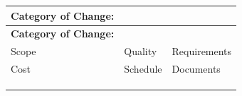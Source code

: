 \documentclass[10pt,letterpaper]{article}
\renewcommand\arraystretch{1.25}
\begin{document}
\begin{center}
\begingroup
\setlength\tabcolsep{2.0pt}
\footnotesize
\renewcommand\arraystretch{1.55}
\begin{longtable}{|>{\raggedright\arraybackslash}p{2.120in}|>{\raggedright\arraybackslash}p{2.120in}|>{\raggedright\arraybackslash}p{2.120in}|}
\hline
\rowcolor{light}
\textbf{Category of Change:} & \rule{0pt}{11pt}\hspace{0pt} & \rule{0pt}{11pt}\hspace{0pt} \\ \hline
\endfirsthead
\hline\rowcolor{light} \textbf{Category of Change:} & \rule{0pt}{11pt}\hspace{0pt} & \rule{0pt}{11pt}\hspace{0pt} \\ \hline
\endhead
[ ] Scope & [ ] Quality & [ ] Requirements \\ \hline
[ ] Cost & [ ] Schedule & [ ] Documents \\ \hline
\rule{0pt}{11pt}\hspace{0pt} & \rule{0pt}{11pt}\hspace{0pt} & \rule{0pt}{11pt}\hspace{0pt} \\ \hline
\rule{0pt}{11pt}\hspace{0pt} & \rule{0pt}{11pt}\hspace{0pt} & \rule{0pt}{11pt}\hspace{0pt} \\ \hline
\rule{0pt}{11pt}\hspace{0pt} & \rule{0pt}{11pt}\hspace{0pt} & \rule{0pt}{11pt}\hspace{0pt} \\ \hline
\end{longtable}
\endgroup
\end{center}
\end{document}
